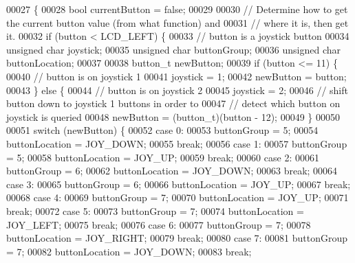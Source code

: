 \begin{DoxyCode}
00027                                      \{
00028   \textcolor{keywordtype}{bool} currentButton = \textcolor{keyword}{false};
00029 
00030   \textcolor{comment}{// Determine how to get the current button value (from what function) and}
00031   \textcolor{comment}{// where it is, then get it.}
00032   \textcolor{keywordflow}{if} (button < LCD_LEFT) \{
00033     \textcolor{comment}{// button is a joystick button}
00034     \textcolor{keywordtype}{unsigned} \textcolor{keywordtype}{char} joystick;
00035     \textcolor{keywordtype}{unsigned} \textcolor{keywordtype}{char} buttonGroup;
00036     \textcolor{keywordtype}{unsigned} \textcolor{keywordtype}{char} buttonLocation;
00037 
00038     button_t newButton;
00039     \textcolor{keywordflow}{if} (button <= 11) \{
00040       \textcolor{comment}{// button is on joystick 1}
00041       joystick = 1;
00042       newButton = button;
00043     \} \textcolor{keywordflow}{else} \{
00044       \textcolor{comment}{// button is on joystick 2}
00045       joystick = 2;
00046       \textcolor{comment}{// shift button down to joystick 1 buttons in order to}
00047       \textcolor{comment}{// detect which button on joystick is queried}
00048       newButton = (button_t)(button - 12);
00049     \}
00050 
00051     \textcolor{keywordflow}{switch} (newButton) \{
00052     \textcolor{keywordflow}{case} 0:
00053       buttonGroup = 5;
00054       buttonLocation = JOY\_DOWN;
00055       \textcolor{keywordflow}{break};
00056     \textcolor{keywordflow}{case} 1:
00057       buttonGroup = 5;
00058       buttonLocation = JOY\_UP;
00059       \textcolor{keywordflow}{break};
00060     \textcolor{keywordflow}{case} 2:
00061       buttonGroup = 6;
00062       buttonLocation = JOY\_DOWN;
00063       \textcolor{keywordflow}{break};
00064     \textcolor{keywordflow}{case} 3:
00065       buttonGroup = 6;
00066       buttonLocation = JOY\_UP;
00067       \textcolor{keywordflow}{break};
00068     \textcolor{keywordflow}{case} 4:
00069       buttonGroup = 7;
00070       buttonLocation = JOY\_UP;
00071       \textcolor{keywordflow}{break};
00072     \textcolor{keywordflow}{case} 5:
00073       buttonGroup = 7;
00074       buttonLocation = JOY\_LEFT;
00075       \textcolor{keywordflow}{break};
00076     \textcolor{keywordflow}{case} 6:
00077       buttonGroup = 7;
00078       buttonLocation = JOY\_RIGHT;
00079       \textcolor{keywordflow}{break};
00080     \textcolor{keywordflow}{case} 7:
00081       buttonGroup = 7;
00082       buttonLocation = JOY\_DOWN;
00083       \textcolor{keywordflow}{break};

\end{DoxyCode}
